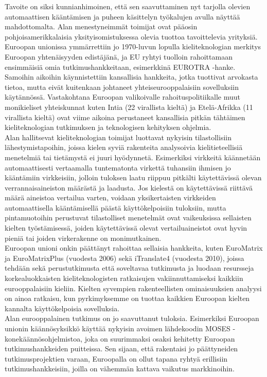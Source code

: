 \begin{multicols}{2}
Tavoite on siksi kunnianhimoinen, että sen saavuttaminen nyt tarjolla olevien
automaattisen kääntämisen ja puheen käsittelyn työkalujen avulla näyttää
mahdottomalta. Alan menestyneimmät toimijat ovat pääosin pohjoisamerikkalaisia
yksityisomistuksessa olevia tuottoa tavoittelevia yrityksiä. Euroopan unionissa
ymmärrettiin jo 1970-luvun lopulla kieliteknologian merkitys Euroopan
yhtenäisyyden edistäjänä, ja EU ryhtyi tuolloin rahoittamaan ensimmäisiä omia
tutkimushankkeitaan, esimerkkinä EUROTRA -hanke. Samoihin aikoihin
käynnistettiin kansallisia hankkeita, jotka tuottivat arvokasta tietoa,
mutta eivät kuitenkaan johtaneet yhteiseurooppalaisiin sovelluksiin
käytännössä. Vastakohtana Euroopan valikoivalle rahoituspolitiikalle muut
monikieliset yhteiskunnat kuten Intia (22 virallista kieltä) ja Etelä-Afrikka
(11 virallista kieltä) ovat viime aikoina perustaneet kansallisia pitkän
tähtäimen kieliteknologian tutkimuksen ja teknologisen kehityksen ohjelmia.\\
Alan hallitsevat kieliteknologian toimijat luottavat nykyisin tilastollisiin
lähestymistapoihin, joissa kielen syviä rakenteita analysoivia
kielitieteellisiä menetelmiä tai tietämystä ei juuri hyödynnetä. Esimerkiksi
virkkeitä käännetään automaattisesti vertaamalla tuntematonta virkettä
tuhansiin ihmisen jo kääntämiin virkkeisiin, jolloin tuloksen laatu riippuu
pitkälti käytettävissä olevan verrannaisaineiston määrästä ja laadusta. Jos
kielestä on käytettävissä riittävä määrä aineistoa vertailua varten, voidaan
yksikertaisten virkkeiden automaattisella kääntämisellä päästä käyttökelpoisiin
tuloksiin, mutta pintamuotoihin perustuvat tilastolliset menetelmät ovat
vaikeuksissa sellaisten kielten työstämisessä, joiden käytettävissä olevat
vertailuaineistot ovat hyvin pieniä tai joiden virkerakenne on monimutkainen.\\
Euroopan unioni onkin päättänyt rahoittaa sellaisia hankkeita, kuten EuroMatrix
ja EuroMatrixPlus (vuodesta 2006) sekä iTranslate4 (vuodesta 2010), joissa
tehdään sekä perustutkimusta että soveltavaa tutkimusta ja luodaan resursseja
korkealuokkaisten kieliteknologisten ratkaisujen vakiinnuttamiseksi kaikkiin
eurooppalaisiin kieliin. Kielten syvempien rakenteellisten ominaisuuksien
analyysi on ainoa ratkaisu, kun pyrkimyksemme on tuottaa kaikkien Euroopan
kielten kannalta käyttökelpoisia sovelluksia.\\
Alan eurooppalainen tutkimus on jo saavuttanut tuloksia. Esimerkiksi Euroopan 
unionin käännösyksikkö käyttää nykyisin avoimen lähdekoodin MOSES -konekäännösohjelmistoa, 
joka on suurimmaksi osaksi kehitetty
Euroopan tutkimushankkeiden puitteissa. Sen sijaan, että rakentaisi jo
päättyneiden tutkimusprojektien varaan, Euroopalla on ollut tapana ryhtyä
erillisiin tutkimushankkeisiin, joilla on vähemmän kattava vaikutus
markkinoihin. 


\end{multicols}
